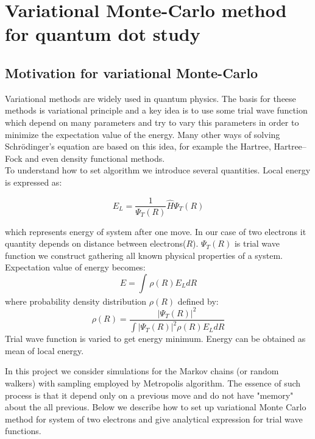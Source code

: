 \documentclass[10pt]{article}
\begin{document}
\newpage
\section{Variational Monte-Carlo method for quantum dot study}\label{Part1}
\subsection{Motivation for variational Monte-Carlo}
Variational methods are widely used in quantum physics. The basis for theese methods is variational principle and a key idea is to use some trial wave function which depend on many parameters and try to vary this parameters in order to minimize the expectation value of the energy. Many other ways of solving Schr\"{o}dinger's equation are based on this idea, for example the Hartree, Hartree–Fock and even density functional methods.\\
To understand how to set algorithm we introduce several quantities. Local energy is expressed as:

\begin{equation*}
E_L = \frac{1}{\Psi_T(R)} \hat{H} \Psi_T(R)
\end{equation*}

which represents energy of system after one move. In our case of two electrons it quantity depends on distance between electrons($R$).
$\Psi_T(R)$ is trial wave function we construct gathering all known physical properties of a system.
Expectation value of energy becomes:
\begin{equation*}
E = \int_{}^{} \rho(R)E_L dR
\end{equation*}
where probability density distribution $\rho(R)$ defined by:
\begin{equation*}
\rho(R) = \frac{|\Psi_T(R)|^2}{\int |\Psi_T(R)|^2\rho(R)E_L dR}
\end{equation*}
Trial wave function is varied to get energy minimum. Energy can be obtained as mean of local energy.

In this project we consider simulations for the Markov chains (or random walkers) with sampling employed by Metropolis algorithm. The essence of such process is that it depend only on a previous move and do not have "memory" about the all previous.
Below we describe how to set up variational Monte Carlo method for system of two electrons and give analytical expression for trial wave functions.
\end{document}
